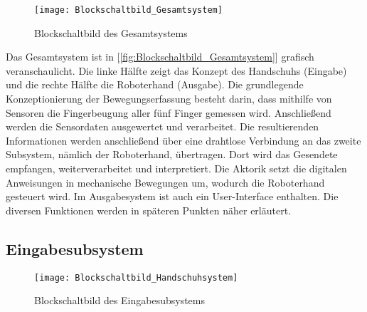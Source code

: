 \documentclass[titlepage,12pt,twoside]{article}
\begin{document}
	\begin{figure}[H]
		\begin{center}
			\scalebox{1.2}
			{\texttt{[image: Blockschaltbild\_Gesamtsystem]}}
			\caption{Blockschaltbild des Gesamtsystems}
			\label{fig:Blockschaltbild_Gesamtsystem}		
		\end{center}
	\end{figure}

Das Gesamtsystem ist in [\textcolor{blue}{\autoref{fig:Blockschaltbild_Gesamtsystem}}] grafisch veranschaulicht. Die linke Hälfte zeigt das Konzept des 
Handschuhs (Eingabe) und die rechte Hälfte die Roboterhand (Ausgabe). Die grundlegende Konzeptionierung der Bewegungserfassung 
besteht darin, dass mithilfe von Sensoren die Fingerbeugung aller fünf Finger gemessen wird. Anschließend werden die Sensordaten
ausgewertet und verarbeitet. Die resultierenden Informationen werden anschließend über eine drahtlose Verbindung an das zweite 
Subsystem, nämlich der Roboterhand, übertragen. Dort wird das Gesendete empfangen, weiterverarbeitet und interpretiert. Die Aktorik
setzt die digitalen Anweisungen in mechanische Bewegungen um, wodurch die Roboterhand gesteuert wird. Im Ausgabesystem ist auch 
ein User-Interface enthalten. Die diversen Funktionen werden in späteren Punkten näher erläutert.

\subsection{Eingabesubsystem}
\label{chap:Eingabesubsystem}

	\begin{figure}[H]
		\begin{center}
			\scalebox{0.8}
			{\texttt{[image: Blockschaltbild\_Handschuhsystem]}}
			\caption{Blockschaltbild des Eingabesubsystems}
			\label{fig:Blockschaltbild_Handschuhsystem}			
		\end{center}
	\end{figure}
\end{document}
